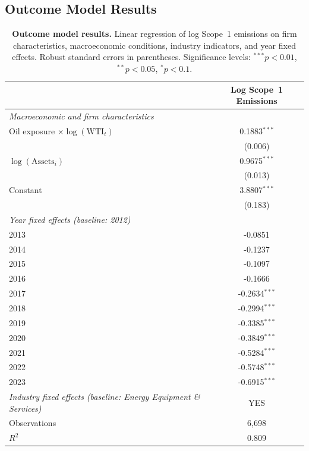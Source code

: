 \documentclass[a4paper,12pt]{article}
\begin{document}
\clearpage

\subsection{Outcome Model Results}

\begin{table}[htbp]
\footnotesize
\centering
\caption{\textbf{Outcome model results.} Linear regression of log Scope~1 emissions on firm characteristics, macroeconomic conditions, industry indicators, and year fixed effects. Robust standard errors in parentheses. Significance levels: $^{***}p<0.01$, $^{**}p<0.05$, $^{*}p<0.1$.}
\label{tab:OutcomeModel_baseline_wti_gind}
\begin{tabular}{l c}
\toprule
 & Log Scope~1 Emissions \\
\midrule
\textit{Macroeconomic and firm characteristics} \\
Oil exposure $\times \log(\mathrm{WTI}_t)$  & 0.1883$^{***}$ \\
      & (0.006) \\
$\log(\mathrm{Assets}_i)$ & 0.9675$^{***}$ \\
      & (0.013) \\
Constant & 3.8807$^{***}$ \\
      & (0.183) \\

\midrule
\textit{Year fixed effects (baseline: 2012)} \\
2013 & -0.0851 \\
2014 & -0.1237 \\
2015 & -0.1097 \\
2016 & -0.1666 \\
2017 & -0.2634$^{***}$ \\
2018 & -0.2994$^{***}$ \\
2019 & -0.3385$^{***}$ \\
2020 & -0.3849$^{***}$ \\
2021 & -0.5284$^{***}$ \\
2022 & -0.5748$^{***}$ \\
2023 & -0.6915$^{***}$ \\

\midrule
\midrule
\textit{Industry fixed effects (baseline: Energy Equipment \& Services)} & YES\\
Observations & 6,698 \\
$R^2$ & 0.809 \\
\bottomrule
\end{tabular}



\begin{flushleft}
\footnotesize
\end{flushleft}
\end{table}
\end{document}
